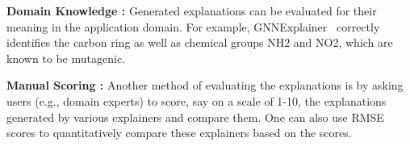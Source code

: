 \noindent \textbf{Domain Knowledge \cite{ying2019gnnexplainer}:} Generated explanations can be evaluated for their meaning in the application domain. For example, GNNExplainer~\cite{ying2019gnnexplainer} correctly identifies the carbon ring as well as chemical groups NH2 and NO2, which are known to be mutagenic. 

\noindent \textbf{Manual Scoring \cite{pgm-ex}:} Another method of evaluating the explanations is by asking users (e.g., domain experts) to score, say on a scale of 1-10, the explanations generated by various explainers and compare them. One can also use RMSE scores to quantitatively compare these explainers based on the scores.


